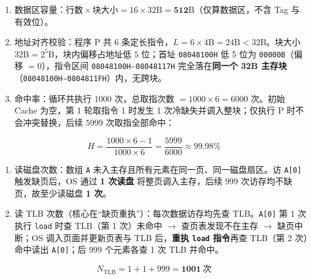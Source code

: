 \documentclass[10pt,a4paper]{ctexart}
\begin{document}

\begin{enumerate}

\item 数据区容量：$\text{行数}\times\text{块大小}=16\times 32\mathrm{B}=\mathbf{512\mathrm{B}}$（仅算数据区，不含 Tag 与有效位）。

\item 地址对齐校验：程序 P 共 $6$ 条定长指令，$L=6\times 4\mathrm{B}=24\mathrm{B}<32\mathrm{B}$。块大小 $32\mathrm{B}=2^5\mathrm{B}$，块内偏移占地址低 $5$ 位；首址 \texttt{08048100H} 低 5 位为 \texttt{00000B}（偏移 $=0$），指令区间 \texttt{08048100H}\textasciitilde{}\texttt{08048117H} 完全落在\textbf{同一个 32B 主存块}（\texttt{08048100H}\textasciitilde{}\texttt{0804811FH}）内，无跨块。

\item 命中率：循环共执行 $1000$ 次，总取指次数 $=1000\times 6=6000$ 次。初始 Cache 为空，第 1 轮取指令 1 时发生 1 次冷缺失并调入整块；仅执行 P 时不会冲突替换，后续 $5999$ 次取指全部命中：

\end{enumerate}

\[
H=\frac{1000\times 6-1}{1000\times 6}=\frac{5999}{6000}\approx\mathbf{99.98\%}
\]


\begin{enumerate}

\item 读磁盘次数：数组 \texttt{A} 未入主存且所有元素在同一页、同一磁盘扇区。访 \texttt{A[0]} 触发缺页后，OS 通过 \textbf{1 次读盘} 将整页调入主存，后续 $999$ 次访存均不缺页，故至少读磁盘 \textbf{1 次}。

\item 读 TLB 次数（核心在“缺页重执”）：每次数据访存均先查 TLB。\texttt{A[0]} 第 1 次执行 \texttt{load} 时查 TLB（第 1 次）未命中 $\to$ 查页表发现不在主存 $\to$ 缺页中断；OS 调入页面并更新页表与 TLB 后，\textbf{重执 \texttt{load} 指令}再查 TLB（第 2 次）命中读出 \texttt{A[0]}；后 $999$ 个元素各查 1 次 TLB 并命中。

\end{enumerate}

\[
N_{\text{TLB}}=1+1+999=\mathbf{1001}\ \text{次}
\]


\end{document}
